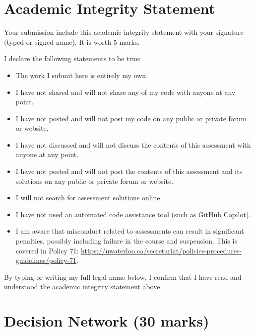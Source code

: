 \documentclass[12pt]{article}
\begin{document}
\newpage
\section*{Academic Integrity Statement}

{\color{red} Your submission include this academic integrity statement with your signature (typed or signed name). It is worth 5 marks.} 

I declare the following statements to be true:

\begin{itemize}
\item 
The work I submit here is entirely my own.

\item 	
I have not shared and will not share any of my code with anyone at any point. 

\item 
I have not posted and will not post my code on any public or private forum or website.

\item 	
I have not discussed and will not discuss the contents of this assessment with anyone at any point.

\item 
I have not posted and will not post the contents of this assessment and its solutions on any public or private forum or website. 

\item 
I will not search for assessment solutions online.

\item
I have not used an automated code assistance tool (such as GitHub Copilot).

\item 
I am aware that misconduct related to assessments can result in significant penalties, possibly including failure in the course and suspension. This is covered in Policy 71: \url{https://uwaterloo.ca/secretariat/policies-procedures-guidelines/policy-71}.
\end{itemize}

By typing or writing my full legal name below, I confirm that I have read and understood the academic integrity statement above.

\vspace{30pt}

\begin{minipage}{12cm}
\hrulefill
\end{minipage}

\newpage
\section{Decision Network (30 marks)}
\label{question_hmm}
\end{document}
